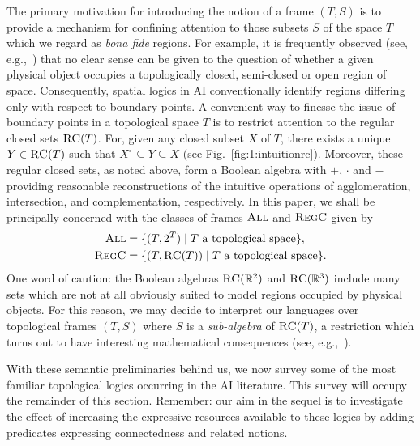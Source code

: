 \documentclass{LMCS}
\theoremstyle{plain}
\newcommand{\ti}[2][]{#2^{\circ_{#1}}}
\newcommand{\All}{\textsc{All}}
\newcommand{\Regc}{\textsc{RegC}}
\newcommand{\Res}{{S}}\newcommand{\RegC}{\textsc{RC}}
\begin{document}
The primary motivation for introducing the notion of a frame
$(T,\Res)$ is to provide a mechanism for confining attention to those
subsets $\Res$ of the space $T$ which we regard as {\em bona fide}
regions.  For example, it is frequently observed (see,
e.g.,~\cite{Galton00}) that no clear sense can be given to the question
of whether a given physical object occupies a topologically closed,
semi-closed or open region of space.  Consequently, spatial logics in
AI conventionally identify regions differing only with respect to
boundary points. A convenient way to finesse the issue of boundary
points in a topological space $T$ is to restrict attention
to the regular closed sets $\RegC(T)$. For, given any closed subset
$X$ of $T$, there exists a unique $Y \in \RegC(T)$ such that $\ti{X}
\subseteq Y \subseteq X$ (see Fig.~\ref{fig:1:intuitionrc}).
Moreover, these regular closed sets, as
noted above, form a Boolean algebra with $+$, $\cdot$ and $-$
providing reasonable reconstructions of the intuitive operations of
agglomeration, intersection, and complementation, respectively. In this
paper, we shall be principally concerned with the classes of frames
$\All$ and $\Regc$ given by
\begin{align*}
\All  &=  \{(T, 2^T) \mid \mbox{$T$ a topological space} \},\\
\Regc &= \{(T, \RegC(T)) \mid \mbox{$T$ a topological space} \}.
\end{align*}
One word of caution: the Boolean algebras $\RegC(\R^2)$ and
$\RegC(\R^3)$ include many sets which are not at all obviously suited
to model regions occupied by physical objects. For this reason, we
may decide to interpret our languages over topological frames
$(T,\Res)$ where $\Res$ is a {\em sub-algebra} of $\RegC(T)$, a
restriction which turns out to have interesting mathematical
consequences (see, e.g.,~\cite{PH:HSL}).

With these semantic preliminaries behind us, we now survey some of the
most familiar topological logics occurring in the AI literature.  This
survey will occupy the remainder of this section.  Remember: our aim
in the sequel is to investigate the effect of increasing the
expressive resources available to these logics by adding predicates
expressing connectedness and related notions.
\end{document}
